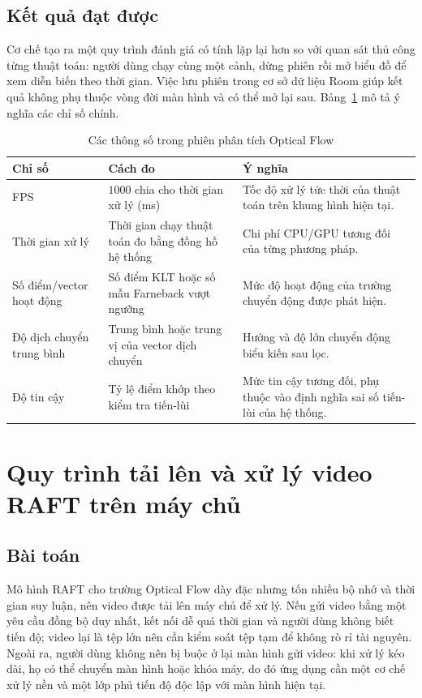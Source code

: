 \documentclass[../DoAn.tex]{subfiles}
\begin{document}
\subsection{Kết quả đạt được}
Cơ chế tạo ra một quy trình đánh giá có tính lặp lại hơn so với quan sát thủ công từng thuật toán: người dùng chạy cùng một cảnh, dừng phiên rồi mở biểu đồ để xem diễn biến theo thời gian. Việc lưu phiên trong cơ sở dữ liệu Room giúp kết quả không phụ thuộc vòng đời màn hình và có thể mở lại sau. Bảng~\ref{table:analytics-metrics} mô tả ý nghĩa các chỉ số chính.

\begin{table}[H]
\centering
\begin{tabular}{|p{3.2cm}|p{4.4cm}|p{5.6cm}|}
\hline
\textbf{Chỉ số} & \textbf{Cách đo} & \textbf{Ý nghĩa} \\ \hline
FPS & $1000$ chia cho thời gian xử lý (ms) & Tốc độ xử lý tức thời của thuật toán trên khung hình hiện tại. \\ \hline
Thời gian xử lý & Thời gian chạy thuật toán đo bằng đồng hồ hệ thống & Chi phí CPU/GPU tương đối của từng phương pháp. \\ \hline
Số điểm/vector hoạt động & Số điểm KLT hoặc số mẫu Farneback vượt ngưỡng & Mức độ hoạt động của trường chuyển động được phát hiện. \\ \hline
Độ dịch chuyển trung bình & Trung bình hoặc trung vị của vector dịch chuyển & Hướng và độ lớn chuyển động biểu kiến sau lọc. \\ \hline
Độ tin cậy & Tỷ lệ điểm khớp theo kiểm tra tiến-lùi & Mức tin cậy tương đối, phụ thuộc vào định nghĩa sai số tiến-lùi của hệ thống. \\ \hline
\end{tabular}
\caption{Các thông số trong phiên phân tích Optical Flow}
\label{table:analytics-metrics}
\end{table}

\section{Quy trình tải lên và xử lý video RAFT trên máy chủ}
\label{section:5.3}
\subsection{Bài toán}
Mô hình RAFT cho trường Optical Flow dày đặc nhưng tốn nhiều bộ nhớ và thời gian suy luận, nên video được tải lên máy chủ để xử lý. Nếu gửi video bằng một yêu cầu đồng bộ duy nhất, kết nối dễ quá thời gian và người dùng không biết tiến độ; video lại là tệp lớn nên cần kiểm soát tệp tạm để không rò rỉ tài nguyên. Ngoài ra, người dùng không nên bị buộc ở lại màn hình gửi video: khi xử lý kéo dài, họ có thể chuyển màn hình hoặc khóa máy, do đó ứng dụng cần một cơ chế xử lý nền và một lớp phủ tiến độ độc lập với màn hình hiện tại.
\end{document}
